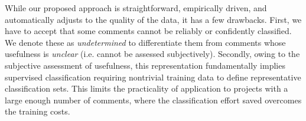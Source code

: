 %
%
%
%
%
% 

While our proposed approach is straightforward, empirically driven, and automatically adjusts to the quality of the data, it has a few drawbacks.
First, we have to accept that some comments cannot be reliably or confidently classified.
We denote these as \emph{undetermined} to differentiate them from comments whose usefulness is \emph{unclear} (i.e. cannot be assessed subjectively).
Secondly, owing to the subjective assessment of usefulness, this representation fundamentally implies supervised classification requiring nontrivial training data to define representative classification sets.
This limits the practicality of application to projects with a large enough number of comments, where the classification effort saved overcomes the training costs.

